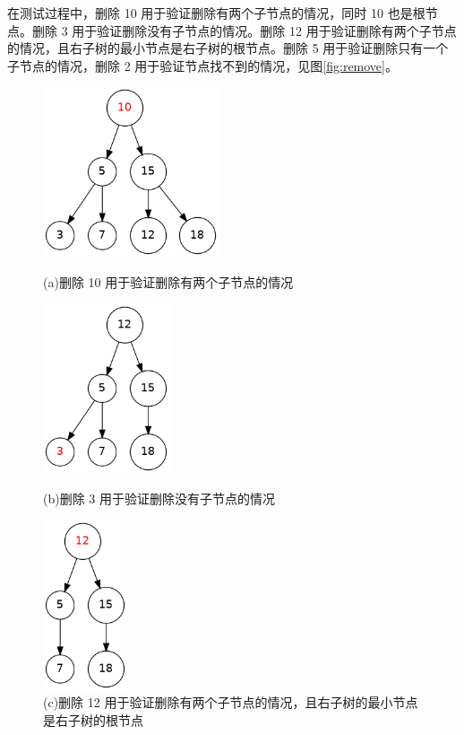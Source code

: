 \documentclass[UTF8]{ctexart}
\begin{document}
在测试过程中，删除 10 用于验证删除有两个子节点的情况，同时 10 也是根节点。删除 3 用于验证删除没有子节点的情况。删除 12 用于验证删除有两个子节点的情况，且右子树的最小节点是右子树的根节点。删除 5 用于验证删除只有一个子节点的情况，删除 2 用于验证节点找不到的情况，见图\ref{fig:remove}。
\begin{figure}[H]
    \centering
    \begin{minipage}[b]{0.45\textwidth}
        \centering
        \includegraphics[height=5cm]{./img/1.png}
        \caption*{(a)删除 10 用于验证删除有两个子节点的情况}
    \end{minipage}
    \hfill
    \begin{minipage}[b]{0.45\textwidth}
        \centering
        \includegraphics[height=5cm]{./img/2.png}
        \caption*{(b)删除 3 用于验证删除没有子节点的情况}
    \end{minipage}
    \vfill
    \begin{minipage}[b]{0.45\textwidth}
        \centering
        \includegraphics[height=5cm]{./img/3.png}
        \caption*{(c)删除 12 用于验证删除有两个子节点的情况，且右子树的最小节点是右子树的根节点}

\end{minipage}
\end{figure}
\end{document}
